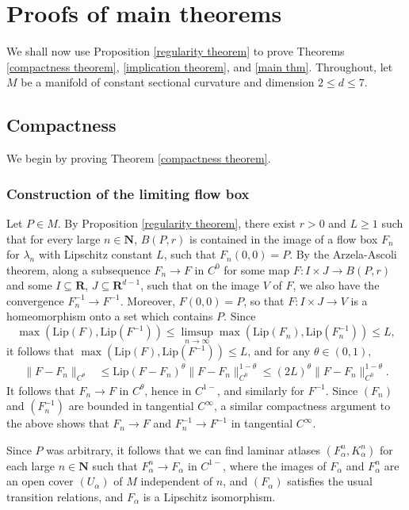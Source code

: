 \documentclass[reqno,11pt]{amsart}
\newcommand{\NN}{\mathbf{N}}
\newcommand{\RR}{\mathbf{R}}
\newcommand{\Lip}{\mathrm{Lip}}
\theoremstyle{definition}
\numberwithin{equation}{section}
\begin{document}
\section{Proofs of main theorems}\label{CompactnessSec}
We shall now use Proposition \ref{regularity theorem} to prove Theorems \ref{compactness theorem}, \ref{implication theorem}, and \ref{main thm}.
Throughout, let $M$ be a manifold of constant sectional curvature and dimension $2 \leq d \leq 7$.

\subsection{Compactness}
We begin by proving Theorem \ref{compactness theorem}.

\subsubsection{Construction of the limiting flow box}
Let $P \in M$.
By Proposition \ref{regularity theorem}, there exist $r > 0$ and $L \geq 1$ such that for every large $n \in \NN$, $B(P, r)$ is contained in the image of a flow box $F_n$ for $\lambda_n$ with Lipschitz constant $L$, such that $F_n(0, 0) = P$.
By the Arzela-Ascoli theorem, along a subsequence $F_n \to F$ in $C^0$ for some map $F: I \times J \to B(P, r)$ and some $I \subseteq \RR$, $J \subseteq \RR^{d - 1}$, such that on the image $V$ of $F$, we also have the convergence $F_n^{-1} \to F^{-1}$.
Moreover, $F(0, 0) = P$, so that $F: I \times J \to V$ is a homeomorphism onto a set which contains $P$.
Since
$$\max(\Lip(F), \Lip(F^{-1})) \leq \limsup_{n \to \infty} \max(\Lip(F_n), \Lip(F_n^{-1})) \leq L,$$
it follows that $\max(\Lip(F), \Lip(F^{-1})) \leq L$, and for any $\theta \in (0, 1)$,
\begin{align*}
	\|F - F_n\|_{C^\theta}
	&\leq \Lip(F - F_n)^\theta \|F - F_n\|_{C^0}^{1 - \theta} \leq (2L)^\theta \|F - F_n\|_{C^0}^{1 - \theta}.
\end{align*}
It follows that $F_n \to F$ in $C^\theta$, hence in $C^{1-}$, and similarly for $F^{-1}$.
Since $(F_n)$ and $(F_n^{-1})$ are bounded in tangential $C^\infty$, a similar compactness argument to the above shows that $F_n \to F$ and $F_n^{-1} \to F^{-1}$ in tangential $C^\infty$.

Since $P$ was arbitrary, it follows that we can find laminar atlases $(F_\alpha^n, K_\alpha^n)$ for each large $n \in \NN$ such that $F_\alpha^n \to F_\alpha$ in $C^{1-}$, where the images of $F_\alpha$ and $F_\alpha^n$ are an open cover $(U_\alpha)$ of $M$ independent of $n$, and $(F_\alpha)$ satisfies the usual transition relations, and $F_\alpha$ is a Lipschitz isomorphism.
\end{document}
